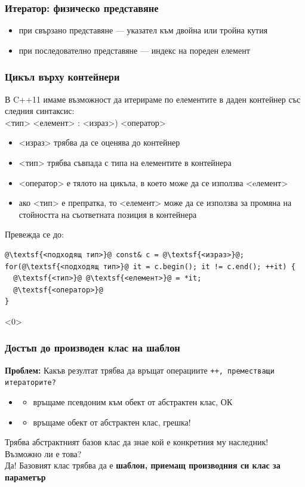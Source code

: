 \documentclass[alsotrans]{beamerswitch}
\def\crtp{0}
\begin{document}
\begin{frame}
  \frametitle{Итератор: физическо представяне}

  \begin{itemize}
  \item при свързано представяне --- указател към двойна или тройна кутия
  \item при последователно представяне --- индекс на пореден елемент
  \end{itemize}
\end{frame}

\begin{frame}[fragile]
  \frametitle{Цикъл върху контейнери}
  В C++11 имаме възможност да итерираме по елементите в даден контейнер със следния синтаксис:\\
  <тип> <елемент> \tta: <израз>\tta) <оператор>
  \pause
  \begin{itemize}[<+->]
  \item{} <израз> трябва да се оценява до контейнер
  \item{} <тип> трябва съвпада с типа на елементите в контейнера
  \item{} <оператор> е тялото на цикъла, в което може да се използва <eлемент>
  \item ако <тип> е препратка, то <елемент> може да се използва за промяна на стойността на съответната позиция в контейнера
  \end{itemize}
  \onslide<+->
  Превежда се до:
\begin{lstlisting}
@\textsf{<подходящ тип>}@ const& c = @\textsf{<израз>}@;
for(@\textsf{<подходящ тип>}@ it = c.begin(); it != c.end(); ++it) {
  @\textsf{<тип>}@ @\textsf{<елемент>}@ = *it;
  @\textsf{<оператор>}@
}
\end{lstlisting}
\end{frame}

\begin{frame}<\crtp>
  \frametitle{Достъп до производен клас на шаблон}

  \textbf{Проблем:} Какъв резултат трябва да връщат операциите \tt{++}, преместващи итераторите?\\[2ex]
  \begin{itemize}
  \item {}
    \begin{itemize}
    \item връщаме псевдоним към обект от абстрактен клас, ОК
    \end{itemize}
  \item{}
    \begin{itemize}
    \item връщаме обект от абстрактен клас, \alert{грешка!}
    \end{itemize}
  \end{itemize}
  \vspace{2ex}
  \pause
  Трябва абстрактният базов клас да знае кой е конкретния му наследник! Възможно ли е това?\\[2ex]
  \pause
  \alert{Да! Базовият клас трябва да е \textbf{шаблон, приемащ производния си клас за параметър}}
\end{frame}
\end{document}
